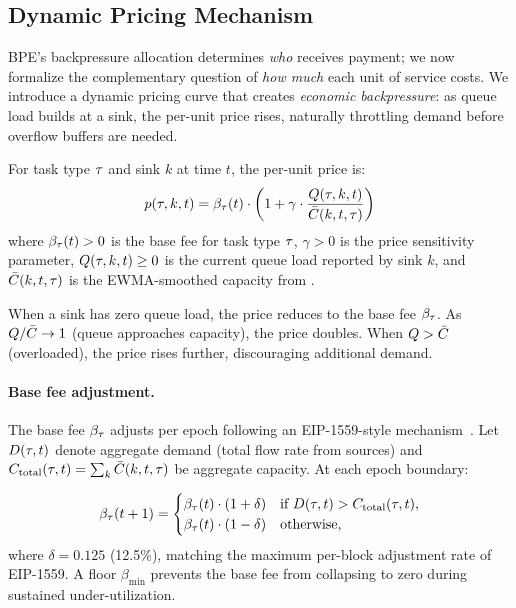 \subsection{Dynamic Pricing Mechanism}
\label{sec:pricing}

BPE's backpressure allocation determines \emph{who} receives payment; we now
formalize the complementary question of \emph{how much} each unit of service
costs. We introduce a dynamic pricing curve that creates \emph{economic
backpressure}: as queue load builds at a sink, the per-unit price rises,
naturally throttling demand before overflow buffers are needed.

\begin{definition}
\label{def:price}
For task type $\tau$ and sink $k$ at time $t$, the per-unit price is:
\begin{equation}
\label{eq:price}
p(\tau, k, t) = \beta_\tau(t) \cdot
    \left(1 + \gamma \cdot \frac{Q(\tau, k, t)}{\bar{C}(k, t, \tau)}\right)
\end{equation}
where $\beta_\tau(t) > 0$ is the base fee for task type $\tau$,
$\gamma > 0$ is the price sensitivity parameter,
$Q(\tau, k, t) \geq 0$ is the current queue load reported by sink $k$,
and $\bar{C}(k, t, \tau)$ is the EWMA-smoothed capacity from .
\end{definition}

When a sink has zero queue load, the price reduces to the base fee $\beta_\tau$.
As $Q / \bar{C} \to 1$ (queue approaches capacity), the price doubles.
When $Q > \bar{C}$ (overloaded), the price rises further, discouraging
additional demand.

\paragraph{Base fee adjustment.}
The base fee $\beta_\tau$ adjusts per epoch following an EIP-1559-style
mechanism~\cite{roughgarden2021eip1559}. Let $D(\tau, t)$ denote aggregate
demand (total flow rate from sources) and $C_{\text{total}}(\tau, t) =
\sum_k \bar{C}(k, t, \tau)$ be aggregate capacity. At each epoch boundary:

\begin{equation}
\label{eq:basefee}
\beta_\tau(t+1) =
\begin{cases}
\beta_\tau(t) \cdot (1 + \delta) & \text{if } D(\tau, t) > C_{\text{total}}(\tau, t), \\
\beta_\tau(t) \cdot (1 - \delta) & \text{otherwise},
\end{cases}
\end{equation}
where $\delta = 0.125$ (12.5\%), matching the maximum per-block adjustment rate
of EIP-1559. A floor $\beta_{\min}$ prevents the base fee from collapsing to zero
during sustained under-utilization.

